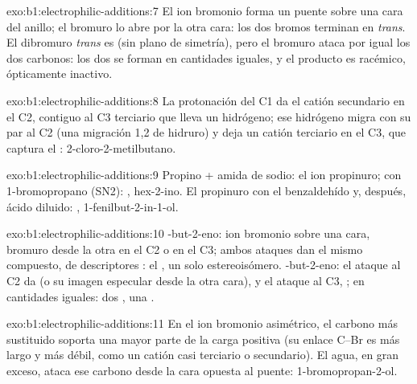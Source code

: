 \begin{solution}{exo:b1:electrophilic-additions:7}
El ion bromonio forma un puente sobre una cara del anillo; el bromuro lo
abre por la otra cara: los dos bromos terminan en \textit{trans}. El
dibromuro \textit{trans} es  (sin plano de simetría), pero el
bromuro ataca por igual los dos carbonos: los dos  se forman
en cantidades iguales, y el producto es racémico, ópticamente inactivo.
\end{solution}

\begin{solution}{exo:b1:electrophilic-additions:8}
La protonación del C1 da el catión secundario en el C2, contiguo al C3
terciario que lleva un hidrógeno; ese hidrógeno migra con su par al C2
(una migración 1,2 de hidruro) y deja un catión terciario en el C3, que
captura el : 2-cloro-2-metilbutano.
\end{solution}

\begin{solution}{exo:b1:electrophilic-additions:9}
Propino + amida de sodio: el ion propinuro; con 1-bromopropano (SN2):
, hex-2-ino. El propinuro con el benzaldehído y,
después, ácido diluido: , 1-fenilbut-2-in-1-ol.
\end{solution}

\begin{solution}{exo:b1:electrophilic-additions:10}
-but-2-eno: ion bromonio sobre una cara, bromuro desde la otra en
el C2 o en el C3; ambos ataques dan el mismo compuesto, de descriptores
: el , un solo estereoisómero.
-but-2-eno: el ataque al C2 da  (o su imagen especular
desde la otra cara), y el ataque al C3, ; en cantidades
iguales: dos , una .
\end{solution}

\begin{solution}{exo:b1:electrophilic-additions:11}
En el ion bromonio asimétrico, el carbono más sustituido soporta una
mayor parte de la carga positiva (su enlace C--Br es más largo y más
débil, como un catión casi terciario o secundario). El agua, en gran
exceso, ataca ese carbono desde la cara opuesta al puente:
1-bromopropan-2-ol.
\end{solution}

